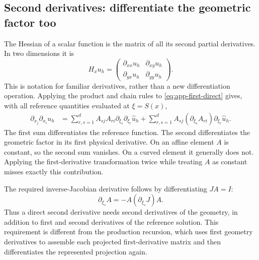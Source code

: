 \subsection{Second derivatives: differentiate the geometric factor too}
The Hessian of a scalar function is the matrix of all its second partial
derivatives. In two dimensions it is
\begin{equation}
 H_xu_h=
 \begin{pmatrix}
 \partial_{xx}u_h&\partial_{xy}u_h\\
 \partial_{yx}u_h&\partial_{yy}u_h
 \end{pmatrix}.
\end{equation}
This is notation for familiar derivatives, rather than a new differentiation
operation. Applying the product and chain rules to
\cref{eq:app-first-direct} gives, with all reference quantities evaluated at
$\xi=S(x)$,
\begin{align}
 \partial_{x_j}\partial_{x_i}u_h
 &=\sum_{r,s=1}^d A_{sj}A_{ri}
                    \partial_{\xi_s}\partial_{\xi_r}\widehat u_h
   +\sum_{r,s=1}^d A_{sj}(\partial_{\xi_s}A_{ri})
                    \partial_{\xi_r}\widehat u_h.
 \label{eq:app-second-direct}
\end{align}
The first sum differentiates the reference function. The second differentiates
the geometric factor in its first physical derivative. On an affine element
$A$ is constant, so the second sum vanishes. On a curved element it generally
does not. Applying the first-derivative transformation twice while treating
$A$ as constant misses exactly this contribution.

The required inverse-Jacobian derivative follows by differentiating
$JA=I$:
\begin{equation}
 \partial_{\xi_s}A=-A(\partial_{\xi_s}J)A.
\end{equation}
Thus a direct second derivative needs second derivatives of the geometry,
in addition to first and second derivatives of the reference solution.
This requirement is different from the production recursion, which uses
first geometry derivatives to assemble each projected first-derivative
matrix and then differentiates the represented projection again.

